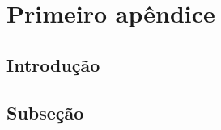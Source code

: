 \artigofalse
\chapter{Primeiro apêndice}
\label{anex:apendiceA}

\tocless\section{Introdução}

\blindtext[2]

\tocless\section{Subseção}

\blindtext[2]
